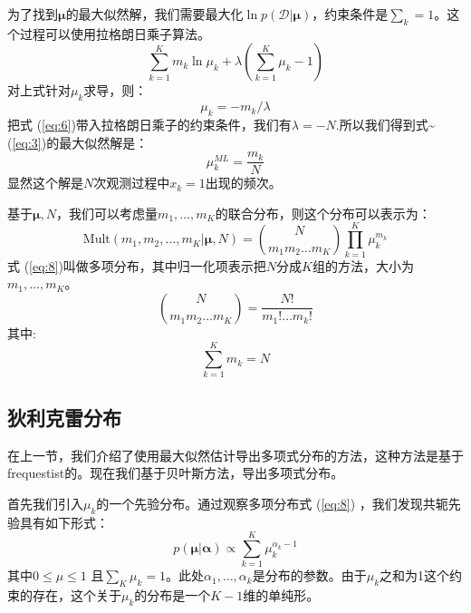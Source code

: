 \documentclass[10pt,a4paper,UTF8]{article}
\begin{document}
为了找到\(\mathbf{\mu}\)的最大似然解，我们需要最大化\(\ln p( \mathcal{D} | \mathbf{\mu} )\)，约束条件是\(\sum_{k} = 1\)。这个过程可以使用拉格朗日乘子算法。
\begin{equation}
\label{eq:5}
\sum_{k=1}^{K}m_{k}\ln \mu_{k}+ \lambda(\sum_{k=1}^{K}\mu_{k} -1)
\end{equation}
对上式针对\(\mu_{k}\)求导，则：
\begin{equation}
\label{eq:6}
\mu_{k} = -m_{k}/\lambda
\end{equation}
把式 (\ref{eq:6})带入拉格朗日乘子的约束条件，我们有\(\lambda = -N\).所以我们得到式\textasciitilde{}(\ref{eq:3})的最大似然解是：
\begin{equation}
\label{eq:7}
\mu_{k}^{ML} = \frac{m_{k}}{N}
\end{equation}
显然这个解是\(N\)次观测过程中\(x_{k}=1\)出现的频次。

基于\(\mathbf{\mu},N\)，我们可以考虑量\(m_{1},\ldots ,m_{K}\)的联合分布，则这个分布可以表示为：
\begin{equation}
\label{eq:8}
\mathrm{Mult}(m_{1},m_{2},\ldots ,m_{K}| \mathbf{\mu},N) = \binom{N}{m_{1}m_{2}\ldots m_{K}} \prod_{k=1}^{K}\mu_{k}^{m_{k}}
\end{equation}
式 (\ref{eq:8})叫做多项分布，其中归一化项表示把\(N\)分成\(K\)组的方法，大小为\(m_{1},\ldots ,m_{K}\)。
\begin{equation}
\label{eq:9}
\binom{N}{m_{1}m_{2}\ldots m_{K}} = \frac{N!}{m_{1}!\ldots m_{k}!}
\end{equation}
其中:
\begin{equation}
\label{eq:10}
\sum_{k=1}^{K}m_{k} = N
\end{equation}

\subsection{狄利克雷分布}
\label{sec:orgd8dacef}


在上一节，我们介绍了使用最大似然估计导出多项式分布的方法，这种方法是基于frequestist的。现在我们基于贝叶斯方法，导出多项式分布。

首先我们引入\(\mu_{k}\)的一个先验分布。通过观察多项分布式 (\ref{eq:8}) ，我们发现共轭先验具有如下形式：
\begin{equation}
\label{eq:11}
p( \mathbf{\mu} | \mathbf{\alpha} ) \propto \sum_{k=1}^{K}\mu_{k}^{\alpha_{k} -1}
\end{equation}
其中\(0 \leq \mu \leq 1\) 且\(\sum_{K}\mu_{k} = 1\)。此处\(\alpha_{1},\ldots ,\alpha_{k}\)是分布的参数。由于\(\mu_{k}\)之和为1这个约束的存在，这个关于\(\mu_{k}\)的分布是一个\(K-1\)维的单纯形。
\end{document}
